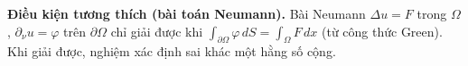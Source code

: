 \textbf{Điều kiện tương thích (bài toán Neumann).}
Bài Neumann $\Delta u=F$ trong $\Omega$, $\partial_\nu u=\varphi$ trên $\partial\Omega$ chỉ giải được khi $\int_{\partial\Omega}\varphi\,dS=\int_\Omega F\,dx$ (từ công thức Green). Khi giải được, nghiệm xác định sai khác một hằng số cộng.
